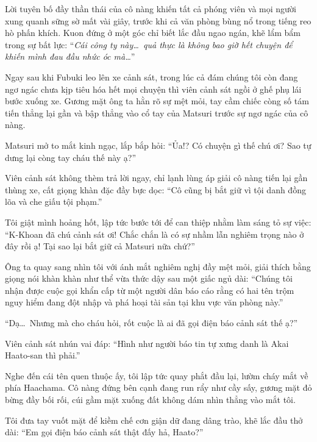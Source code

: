 \documentclass[../main.tex]{subfiles}
\begin{document}
Lời tuyên bố đầy thần thái của cô nàng khiến tất cả phóng viên và mọi người xung quanh sững sờ mất vài giây, trước khi cả văn phòng bùng nổ trong tiếng reo hò phấn khích. Kuon đứng ở một góc chỉ biết lắc đầu ngao ngán, khẽ lẩm bẩm trong sự bất lực: ``\textit{Cái công ty này\dots\ quả thực là không bao giờ hết chuyện để khiến mình đau đầu nhức óc mà\dots}''

\omk


Ngay sau khi Fubuki leo lên xe cảnh sát, trong lúc cả đám chúng tôi còn đang ngơ ngác chưa kịp tiêu hóa hết mọi chuyện thì viên cảnh sát ngồi ở ghế phụ lái bước xuống xe. Gương mặt ông ta hằn rõ sự mệt mỏi, tay cầm chiếc còng số tám tiến thẳng lại gần và bập thẳng vào cổ tay của Matsuri trước sự ngơ ngác của cô nàng.

Matsuri mở to mắt kinh ngạc, lắp bắp hỏi:
``Ủa!? Có chuyện gì thế chú ơi? Sao tự dưng lại còng tay cháu thế này ạ?''

Viên cảnh sát không thèm trả lời ngay, chỉ lạnh lùng áp giải cô nàng tiến lại gần thùng xe, cất giọng khàn đặc đầy bực dọc:
``Cô cũng bị bắt giữ vì tội danh đồng lõa và che giấu tội phạm.''

Tôi giật mình hoảng hốt, lập tức bước tới để can thiệp nhằm làm sáng tỏ sự việc:
``K-Khoan đã chú cảnh sát ơi! Chắc chắn là có sự nhầm lẫn nghiêm trọng nào ở đây rồi ạ! Tại sao lại bắt giữ cả Matsuri nữa chứ?''

Ông ta quay sang nhìn tôi với ánh mắt nghiêm nghị đầy mệt mỏi, giải thích bằng giọng nói khàn khàn như thể vừa thức dậy sau một giấc ngủ dài:
``Chúng tôi nhận được cuộc gọi khẩn cấp từ một người dân báo cáo rằng có hai tên trộm nguy hiểm đang đột nhập và phá hoại tài sản tại khu vực văn phòng này.''

``Dạ\dots\ Nhưng mà cho cháu hỏi, rốt cuộc là ai đã gọi điện báo cảnh sát thế ạ?''

Viên cảnh sát nhún vai đáp:
``Hình như người báo tin tự xưng danh là Akai Haato-san thì phải.''

Nghe đến cái tên quen thuộc ấy, tôi lập tức quay phắt đầu lại, lườm cháy mắt về phía Haachama. Cô nàng đứng bên cạnh đang run rẩy như cầy sấy, gương mặt đỏ bừng đầy bối rối, cúi gầm mặt xuống đất không dám nhìn thẳng vào mắt tôi.

Tôi đưa tay vuốt mặt để kiềm chế cơn giận dữ đang dâng trào, khẽ lắc đầu thở dài:
``Em gọi điện báo cảnh sát thật đấy hả, Haato?''
\end{document}
